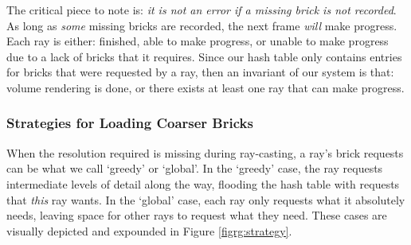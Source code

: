The critical piece to note is: \emph{it is not an error if a
missing brick is not recorded}.  As long as \emph{some}
missing bricks are recorded, the next frame \emph{will} make progress.
Each ray is either: finished, able to make progress, or unable to make
progress due to a lack of bricks that it requires.  Since our hash
table only contains entries for bricks that were requested by a ray,
then an invariant of our system is that: volume rendering is done, or
there exists at least one ray that can make progress.


%

\subsubsection{Strategies for Loading Coarser Bricks}

When the resolution required is missing during ray-casting, a ray's
brick requests can be what we call `greedy' or `global'.  In the
`greedy' case, the ray requests intermediate levels of detail along the
way, flooding the hash table with
requests that \textit{this} ray wants.  In the `global' case, each
ray only requests what it absolutely needs, leaving space for other
rays to request what they need.  These cases are visually depicted and
expounded in Figure
\ref{figrg:strategy}.

